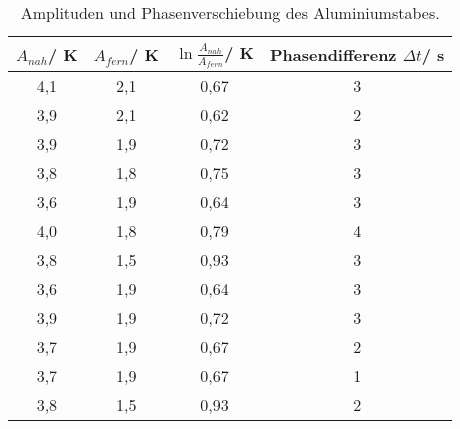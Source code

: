\begin{table}[H]
  \centering
   \begin{tabular}{c c c c}
    \toprule
     $A_{nah}$/ K & $A_{fern}$/ K & $\ln{\frac{A_{nah}}{A_{fern}}}$/ K & Phasendifferenz $\Delta t$/ s\\
    \midrule
    4,1 & 2,1 & 0,67 & 3\\
    3,9 & 2,1 & 0,62 & 2\\
    3,9 & 1,9 & 0,72 & 3\\
    3,8 & 1,8 & 0,75 & 3\\
    3,6 & 1,9 & 0,64 & 3\\
    4,0 & 1,8 & 0,79 & 4\\
    3,8 & 1,5 & 0,93 & 3\\
    3,6 & 1,9 & 0,64 & 3\\
    3,9 & 1,9 & 0,72 & 3\\
    3,7 & 1,9 & 0,67 & 2\\
    3,7 & 1,9 & 0,67 & 1\\
    3,8 & 1,5 & 0,93 & 2\\
    \bottomrule
  \end{tabular}
  \caption{Amplituden und Phasenverschiebung des Aluminiumstabes.}
  \label{tab:tab3}
\end{table}
